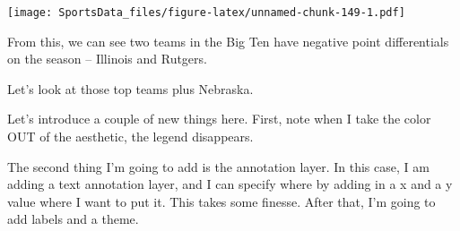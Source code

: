 \documentclass[]{book}
\newenvironment{Shaded}{\begin{snugshade}}{\end{snugshade}}
\newcommand{\KeywordTok}[1]{\textcolor[rgb]{0.13,0.29,0.53}{\textbf{#1}}}
\newcommand{\StringTok}[1]{\textcolor[rgb]{0.31,0.60,0.02}{#1}}
\newcommand{\OperatorTok}[1]{\textcolor[rgb]{0.81,0.36,0.00}{\textbf{#1}}}
\newcommand{\NormalTok}[1]{#1}
\begin{document}
\texttt{[image: SportsData\_files/figure-latex/unnamed-chunk-149-1.pdf]}

From this, we can see two teams in the Big Ten have negative point
differentials on the season -- Illinois and Rutgers.

Let's look at those top teams plus Nebraska.

\begin{Shaded}
\end{Shaded}

Let's introduce a couple of new things here. First, note when I take the
color OUT of the aesthetic, the legend disappears.

The second thing I'm going to add is the annotation layer. In this case,
I am adding a text annotation layer, and I can specify where by adding
in a x and a y value where I want to put it. This takes some finesse.
After that, I'm going to add labels and a theme.
\end{document}
